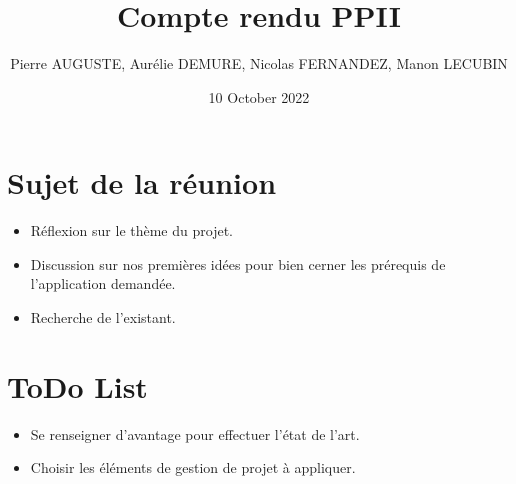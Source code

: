 \documentclass{article}
\title{Compte rendu PPII}
\author{Pierre AUGUSTE, Aurélie DEMURE, Nicolas FERNANDEZ, Manon LECUBIN}
\date{10 October 2022}
\begin{document}
\maketitle

\section{Sujet de la réunion}

\begin{itemize}
    \item Réflexion sur le thème du projet.
    \item Discussion sur nos premières idées pour bien cerner les prérequis de
            l'application demandée.
    \item Recherche de l'existant.
\end{itemize}

\section{ToDo List}
\begin{itemize}
    \item Se renseigner d'avantage pour effectuer l'état de l'art.
    \item Choisir les éléments de gestion de projet à appliquer.
\end{itemize}
\end{document}

